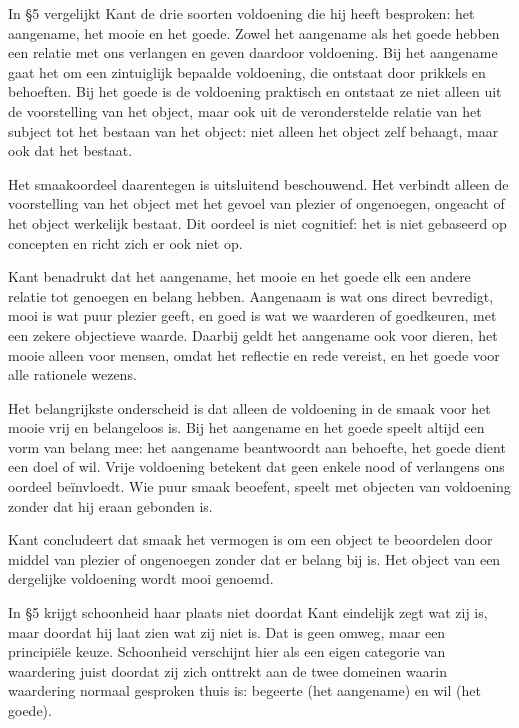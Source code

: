 \begin{mdframed}[leftmargin=0pt,rightmargin=0pt,backgroundcolor=blue!6,linecolor=white,innertopmargin=6pt,innerbottommargin=6pt]

In §5 vergelijkt Kant de drie soorten voldoening die hij heeft besproken: het aangename, het mooie en het goede. Zowel het aangename als het goede hebben een relatie met ons verlangen en geven daardoor voldoening. Bij het aangename gaat het om een zintuiglijk bepaalde voldoening, die ontstaat door prikkels en behoeften. Bij het goede is de voldoening praktisch en ontstaat ze niet alleen uit de voorstelling van het object, maar ook uit de veronderstelde relatie van het subject tot het bestaan van het object: niet alleen het object zelf behaagt, maar ook dat het bestaat.

Het smaakoordeel daarentegen is uitsluitend beschouwend. Het verbindt alleen de voorstelling van het object met het gevoel van plezier of ongenoegen, ongeacht of het object werkelijk bestaat. Dit oordeel is niet cognitief: het is niet gebaseerd op concepten en richt zich er ook niet op.

Kant benadrukt dat het aangename, het mooie en het goede elk een andere relatie tot genoegen en belang hebben. Aangenaam is wat ons direct bevredigt, mooi is wat puur plezier geeft, en goed is wat we waarderen of goedkeuren, met een zekere objectieve waarde. Daarbij geldt het aangename ook voor dieren, het mooie alleen voor mensen, omdat het reflectie en rede vereist, en het goede voor alle rationele wezens.

Het belangrijkste onderscheid is dat alleen de voldoening in de smaak voor het mooie vrij en belangeloos is. Bij het aangename en het goede speelt altijd een vorm van belang mee: het aangename beantwoordt aan behoefte, het goede dient een doel of wil. Vrije voldoening betekent dat geen enkele nood of verlangens ons oordeel beïnvloedt. Wie puur smaak beoefent, speelt met objecten van voldoening zonder dat hij eraan gebonden is.

Kant concludeert dat smaak het vermogen is om een object te beoordelen door middel van plezier of ongenoegen zonder dat er belang bij is. Het object van een dergelijke voldoening wordt mooi genoemd.

\bigskip
In §5 krijgt schoonheid haar plaats niet doordat Kant eindelijk zegt wat zij is, maar doordat hij laat zien wat zij niet is. Dat is geen omweg, maar een principiële keuze. Schoonheid verschijnt hier als een eigen categorie van waardering juist doordat zij zich onttrekt aan de twee domeinen waarin waardering normaal gesproken thuis is: begeerte (het aangename) en wil (het goede).


\end{mdframed}
